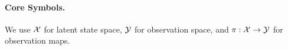 \paragraph{Core Symbols.} We use $\mathcal{X}$ for latent state space, $\mathcal{Y}$ for observation space, and $\pi:\mathcal{X}\to\mathcal{Y}$ for observation maps.\n